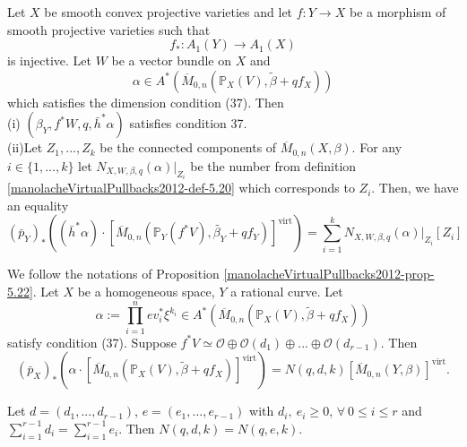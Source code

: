 \begin{proposition}\label{manolacheVirtualPullbacks2012-prop-5.22}
\label{manolacheVirtualPullbacks2012-projb} Let $X$ be smooth convex projective varieties and let $f:Y\to X$ be a morphism of smooth projective varieties such that $$f_*:A_1(Y)\to A_1(X)$$ is injective. Let $W$ be a vector bundle on $X$ and $$\alpha\in A^*(\overline{M}_{0,n}(\mathbb{P}_X(V),\tilde{\beta}+qf_X))$$ which satisfies the dimension condition (37). Then
\\(i) $(\beta_Y, f^*W,q, \bar{h}^*\alpha)$ satisfies condition 37.
\\(ii)Let $Z_1,...,Z_k$ be the connected components of $\overline{M}_{0,n}(X,\beta)$. For any $i\in\{1,...,k\}$ let $N_{X,W,\beta,q}(\alpha)|_{Z_i}$ be the number from definition \ref{manolacheVirtualPullbacks2012-def-5.20} which corresponds to $Z_i$. Then, we have an equality
\begin{equation*}

(\bar{p}_Y)_*\left((\bar{h}^*\alpha)\cdot[\overline{M}_{0,n}(\mathbb{P}_{Y}(f^*V),\tilde{\beta_Y}+qf_Y)]^{\mathrm{virt}}\right)=\sum_{i=1}^kN_{X,W,\beta,q}(\alpha)|_{Z_i}[Z_i]
\end{equation*}
\end{proposition}

\begin{corollary}\label{manolacheVirtualPullbacks2012-cor-5.23}
\label{manolacheVirtualPullbacks2012-convexbdl} We follow the notations of Proposition \ref{manolacheVirtualPullbacks2012-prop-5.22}. Let $X$ be a homogeneous space, $Y$ a rational curve. Let $$\alpha:=\prod_{i=1}^nev_i^*\xi^{k_i}\in A^*(\overline{M}_{0,n}(\mathbb{P}_{X}(V),\tilde{\beta}+qf_{X}))$$ satisfy condition (37). Suppose $f^*V\simeq \mathcal{O}\oplus\mathcal{O}(d_1)\oplus...\oplus\mathcal{O}(d_{r-1})$. Then $$(\bar{p}_{X})_* \left(\alpha\cdot[\overline{M}_{0,n}(\mathbb{P}_{X}(V),\tilde{\beta}+qf_{X})]^{\mathrm{virt}}\right)=N(q,d, k)[\overline{M}_{0,n}(Y,\beta)]^{\mathrm{virt}}.$$
\end{corollary}

\begin{corollary}\label{manolacheVirtualPullbacks2012-cor-5.24}
\label{manolacheVirtualPullbacks2012-jump} Let $d=(d_1,...,d_{r-1})$, $e=(e_1,...,e_{r-1})$ with $d_i,\ e_i\geq 0$, $\forall\ 0\leq i\leq r$ and $\sum_{i=1}^{r-1} d_i=\sum_{i=1}^{r-1} e_i$. Then $N(q,d,k)=N(q,e,k)$.
\end{corollary}

